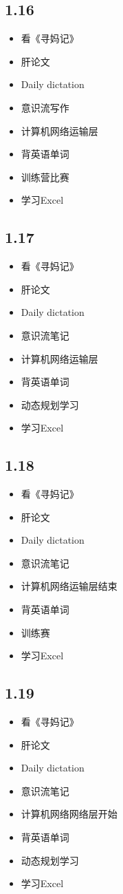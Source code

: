 \documentclass[UTF8]{ctexart}
\begin{document}
\subsection*{1.16}
\begin{itemize}
    \item 看《寻妈记》
    \item 肝论文
    \item Daily dictation
    \item 意识流写作
    \item 计算机网络运输层
    \item 背英语单词
    \item 训练营比赛
    \item 学习Excel
\end{itemize}
\subsection*{1.17}
\begin{itemize}
    \item 看《寻妈记》
    \item 肝论文
    \item Daily dictation
    \item 意识流笔记
    \item 计算机网络运输层
    \item 背英语单词
    \item 动态规划学习
    \item 学习Excel
\end{itemize}
\subsection*{1.18}
\begin{itemize}
    \item 看《寻妈记》
    \item 肝论文
    \item Daily dictation
    \item 意识流笔记
    \item 计算机网络运输层结束
    \item 背英语单词
    \item 训练赛
    \item 学习Excel
\end{itemize}
\subsection*{1.19}
\begin{itemize}
    \item 看《寻妈记》
    \item 肝论文
    \item Daily dictation
    \item 意识流笔记
    \item 计算机网络网络层开始
    \item 背英语单词
    \item 动态规划学习
    \item 学习Excel
\end{itemize}
\end{document}
